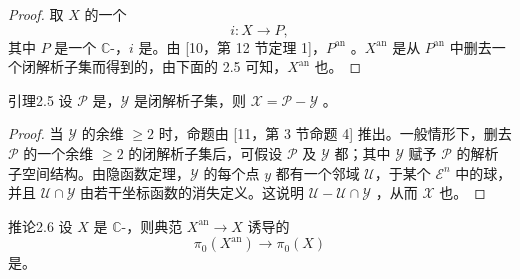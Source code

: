 \begin{proof}
取 $X$ 的一个
\[
i:X\longrightarrow P,
\]
其中 $P$ 是一个 $\mathbb C$-，$i$ 是。由 [10，第 12 节定理 1]，$P^{\mathrm{an}}$ 。$X^{\mathrm{an}}$ 是从 $P^{\mathrm{an}}$ 中删去一个闭解析子集而得到的，由下面的 2.5 可知，$X^{\mathrm{an}}$ 也。
\end{proof}

\begin{SGAresult}{引理}{2.5}
设 $\mathcal P$ 是，$\mathcal Y$ 是闭解析子集，则 $\mathcal X=\mathcal P-\mathcal Y$ 。
\end{SGAresult}
\begin{proof}
当 $\mathcal Y$ 的余维 $\geq2$ 时，命题由 [11，第 3 节命题 4] 推出。一般情形下，删去 $\mathcal P$ 的一个余维 $\geq2$ 的闭解析子集后，可假设 $\mathcal P$ 及 $\mathcal Y$ 都；其中 $\mathcal Y$ 赋予 $\mathcal P$ 的解析子空间结构。由隐函数定理，$\mathcal Y$ 的每个点 $y$ 都有一个邻域 $\mathcal U$，于某个 $\mathcal E^n$ 中的球，并且 $\mathcal U\cap\mathcal Y$ 由若干坐标函数的消失定义。这说明 $\mathcal U-\mathcal U\cap\mathcal Y$ ，从而 $\mathcal X$ 也。
\end{proof}

\begin{SGAresult}{推论}{2.6}
设 $X$ 是 $\mathbb C$-，则典范 $X^{\mathrm{an}}\to X$ 诱导的
\[
\pi_0(X^{\mathrm{an}})\longrightarrow\pi_0(X)
\]
是。
\end{SGAresult}

